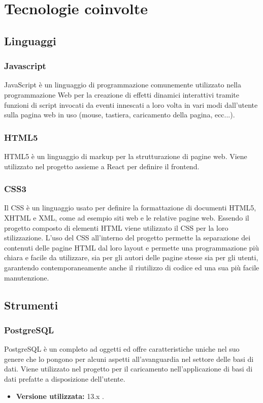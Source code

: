 \section{Tecnologie coinvolte}
\subsection{Linguaggi}
\subsubsection{Javascript}
JavaScript è un linguaggio di programmazione  comunemente utilizzato nella programmazione Web per la creazione di effetti dinamici interattivi tramite funzioni di script invocati da eventi innescati a loro volta in vari modi dall'utente sulla pagina web in uso (mouse, tastiera, caricamento della pagina, ecc...).
\subsubsection{HTML5}
HTML5 è un linguaggio di markup per la strutturazione di pagine web. Viene utilizzato
nel progetto \NomeProgetto{} assieme a React per definire il frontend.
\subsubsection{CSS3}
Il CSS è un linguaggio usato per definire la formattazione di documenti HTML5, XHTML e XML, come ad esempio siti web e le relative pagine web.
Essendo il progetto \NomeProgetto{} composto di elementi HTML viene utilizzato il CSS per la loro stilizzazione. L’uso del CSS all'interno del progetto permette la separazione dei contenuti delle pagine HTML dal loro layout e permette una programmazione più chiara e facile da utilizzare, sia per gli autori delle pagine stesse sia per gli utenti, garantendo contemporaneamente anche il riutilizzo di codice ed una sua più facile manutenzione.

\subsection{Strumenti}
\subsubsection{PostgreSQL}
PostgreSQL è un completo  ad oggetti ed offre caratteristiche uniche nel suo genere che lo pongono per alcuni aspetti all'avanguardia nel settore delle basi di dati. Viene utilizzato nel progetto per il caricamento nell'applicazione di basi di dati prefatte a disposizione dell'utente.
\begin{itemize}
\item \textbf{Versione utilizzata:} 13.x .
\end{itemize}

